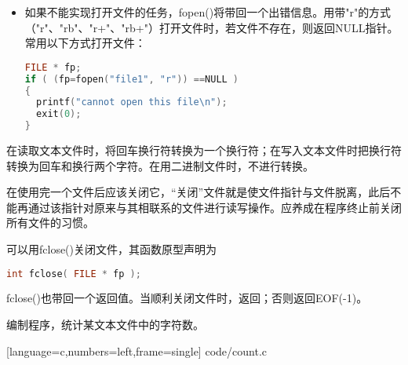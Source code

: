 \begin{frame}[fragile]\ft{\secname}
  \begin{itemize}
  \item 如果不能实现打开文件的任务，{\tf fopen()}将带回一个出错信息。用带{\tf "r"}的方式{\tf （"r"、"rb"、"r+"、"rb+"）}打开文件时，若文件不存在，则返回{\tf NULL}指针。常用以下方式打开文件：
\begin{lstlisting}[language=c,backgroundcolor=\color{red!20}]
FILE * fp;
if ( (fp=fopen("file1", "r")) ==NULL )
{
  printf("cannot open this file\n");
  exit(0);
}
\end{lstlisting}
  \end{itemize}
\end{frame}

\begin{frame}[fragile]\ft{\secname}
  \textcolor{acolor3}{ 在读取文本文件时，将回车换行符转换为一个换行符；在写入文本文件时把换行符转换为回车和换行两个字符。在用二进制文件时，不进行转换。}
  
\end{frame}

\begin{frame}[fragile]
在使用完一个文件后应该关闭它，“关闭”文件就是使文件指针与文件脱离，此后不能再通过该指针对原来与其相联系的文件进行读写操作。\textcolor{acolor1}{应养成在程序终止前关闭所有文件的习惯。}
\end{frame}

\begin{frame}[fragile]\ft{\secname}
可以用{\tf fclose()}关闭文件，其函数原型声明为

\begin{lstlisting}[language=c,backgroundcolor=\color{red!20}]
int fclose( FILE * fp );
\end{lstlisting}

{\tf fclose()}也带回一个返回值。当顺利关闭文件时，返回{}；否则返回{\tf EOF(-1)}。
\end{frame}

\begin{frame}[fragile]\ft{\secname}
\begin{li}
  编制程序，统计某文本文件中的字符数。
\end{li}
\end{frame}

\begin{frame}\ft{\secname}
  
  [language=c,numbers=left,frame=single]
  {code/count.c}
\end{frame}
